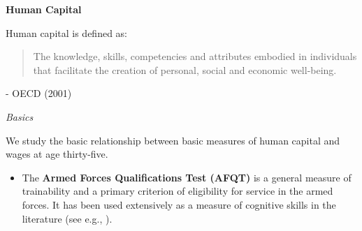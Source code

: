 \begin{frame}\begin{center}
    \LARGE\textbf{Human Capital}
\end{center}\end{frame}
\begin{frame}
Human capital is defined as:
\vspace{\baselineskip}

\begin{quote}
The knowledge, skills, competencies and attributes embodied in individuals that facilitate
the creation of personal, social and economic well-being.
\end{quote}\vspace{-0.5pt} \hspace{6cm} - OECD (2001)
\end{frame}
\begin{frame}\begin{center}
\LARGE\textit{Basics}
\end{center}\end{frame}
\begin{frame}
We study the basic relationship between basic measures of human capital and wages at age thirty-five.
\end{frame}
\begin{frame}
\begin{itemize}
\item The \textbf{ Armed Forces Qualifications Test (AFQT)} is a general measure of trainability and a primary criterion of eligibility for service in the armed forces. It has been used extensively as a measure of cognitive skills in the literature (see e.g., \citealp{Heckman.2005c, Neal.1996, Cameron.1998, Ellwood.2000, Cameron.2001, Osborne-Groves.2005}).
\end{itemize}
\end{frame}
